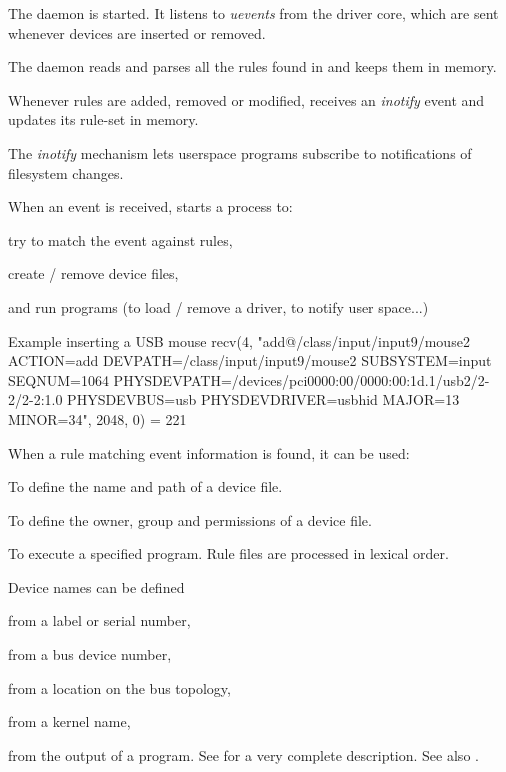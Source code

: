   \startitemize
  \item The  daemon is started.  It listens to {\em uevents}
    from the driver core, which are sent whenever devices are inserted
    or removed.
  \item The  daemon reads and parses all the rules found
    in  and keeps them in memory.
  \item Whenever rules are added, removed or modified, 
    receives an {\em inotify} event and updates its rule-set in memory.
    \startitemize
    \item The {\em inotify} mechanism lets userspace programs
      subscribe to notifications of filesystem changes.
    \item When an event is received,  starts a process to:
      \startitemize
      \item try to match the event against  rules,
      \item create / remove device files,
      \item and run programs (to load / remove a driver, to notify user
        space...)
      \stopitemize
    \stopitemize
  \stopitemize

  Example inserting a USB mouse
\starttyping
recv(4,
     "add@/class/input/input9/mouse2\0
     ACTION=add\0
     DEVPATH=/class/input/input9/mouse2\0
     SUBSYSTEM=input\0
     SEQNUM=1064\0
     PHYSDEVPATH=/devices/pci0000:00/0000:00:1d.1/usb2/2-2/2-2:1.0\0
     PHYSDEVBUS=usb\0
     PHYSDEVDRIVER=usbhid\0
     MAJOR=13\0
     MINOR=34\0",
     2048,
     0)
= 221
\stoptyping

  When a  rule matching event information is found, it can be
  used:
  \startitemize
  \item To define the name and path of a device file.
  \item To define the owner, group and permissions of a device file.
  \item To execute a specified program.
  \stopitemize
  Rule files are processed in lexical order.

  Device names can be defined
  \startitemize
  \item from a label or serial number,
  \item from a bus device number,
  \item from a location on the bus topology,
  \item from a kernel name,
  \item from the output of a program.
  \stopitemize
See 
for a very complete description. See also .

